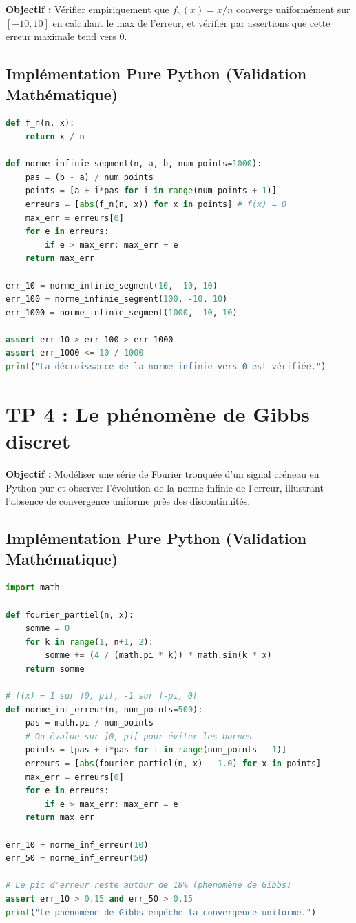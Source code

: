 \documentclass{report}
\begin{document}
\textbf{Objectif :} Vérifier empiriquement que $f_n(x) = x/n$ converge uniformément sur $[-10, 10]$ en calculant le max de l'erreur, et vérifier par assertions que cette erreur maximale tend vers $0$.

\section*{Implémentation Pure Python (Validation Mathématique)}

\begin{lstlisting}[language=Python]
def f_n(n, x):
    return x / n

def norme_infinie_segment(n, a, b, num_points=1000):
    pas = (b - a) / num_points
    points = [a + i*pas for i in range(num_points + 1)]
    erreurs = [abs(f_n(n, x)) for x in points] # f(x) = 0
    max_err = erreurs[0]
    for e in erreurs:
        if e > max_err: max_err = e
    return max_err

err_10 = norme_infinie_segment(10, -10, 10)
err_100 = norme_infinie_segment(100, -10, 10)
err_1000 = norme_infinie_segment(1000, -10, 10)

assert err_10 > err_100 > err_1000
assert err_1000 <= 10 / 1000
print("La décroissance de la norme infinie vers 0 est vérifiée.")
\end{lstlisting}

\newpage


\chapter*{TP 4 : Le phénomène de Gibbs discret}

\textbf{Objectif :} Modéliser une série de Fourier tronquée d'un signal créneau en Python pur et observer l'évolution de la norme infinie de l'erreur, illustrant l'absence de convergence uniforme près des discontinuités.

\section*{Implémentation Pure Python (Validation Mathématique)}

\begin{lstlisting}[language=Python]
import math

def fourier_partiel(n, x):
    somme = 0
    for k in range(1, n+1, 2):
        somme += (4 / (math.pi * k)) * math.sin(k * x)
    return somme

# f(x) = 1 sur ]0, pi[, -1 sur ]-pi, 0[
def norme_inf_erreur(n, num_points=500):
    pas = math.pi / num_points
    # On évalue sur ]0, pi[ pour éviter les bornes
    points = [pas + i*pas for i in range(num_points - 1)]
    erreurs = [abs(fourier_partiel(n, x) - 1.0) for x in points]
    max_err = erreurs[0]
    for e in erreurs:
        if e > max_err: max_err = e
    return max_err

err_10 = norme_inf_erreur(10)
err_50 = norme_inf_erreur(50)

# Le pic d'erreur reste autour de 18% (phénomène de Gibbs)
assert err_10 > 0.15 and err_50 > 0.15
print("Le phénomène de Gibbs empêche la convergence uniforme.")
\end{lstlisting}
\end{document}
